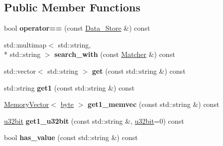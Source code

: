 \subsection*{Public Member Functions}
\begin{DoxyCompactItemize}
\item 
\hypertarget{classBotan_1_1Data__Store_a2b12f45cb3db15368eaa6463dc61c95f}{bool {\bfseries operator==} (const \hyperlink{classBotan_1_1Data__Store}{Data\-\_\-\-Store} \&) const }\label{classBotan_1_1Data__Store_a2b12f45cb3db15368eaa6463dc61c95f}

\item 
\hypertarget{classBotan_1_1Data__Store_a09a1fe6238a5af9b865b87dec741e165}{std\-::multimap$<$ std\-::string, \\*
std\-::string $>$ {\bfseries search\-\_\-with} (const \hyperlink{classBotan_1_1Data__Store_1_1Matcher}{Matcher} \&) const }\label{classBotan_1_1Data__Store_a09a1fe6238a5af9b865b87dec741e165}

\item 
\hypertarget{classBotan_1_1Data__Store_a5ae0472aff39fdf3799c735cf8a9aabc}{std\-::vector$<$ std\-::string $>$ {\bfseries get} (const std\-::string \&) const }\label{classBotan_1_1Data__Store_a5ae0472aff39fdf3799c735cf8a9aabc}

\item 
\hypertarget{classBotan_1_1Data__Store_af67e18961f5c353f710dced52b02a9da}{std\-::string {\bfseries get1} (const std\-::string \&) const }\label{classBotan_1_1Data__Store_af67e18961f5c353f710dced52b02a9da}

\item 
\hypertarget{classBotan_1_1Data__Store_a4db45f79562d4e91843bc72ca56f9c3b}{\hyperlink{classBotan_1_1MemoryVector}{Memory\-Vector}$<$ \hyperlink{namespaceBotan_a7d793989d801281df48c6b19616b8b84}{byte} $>$ {\bfseries get1\-\_\-memvec} (const std\-::string \&) const }\label{classBotan_1_1Data__Store_a4db45f79562d4e91843bc72ca56f9c3b}

\item 
\hypertarget{classBotan_1_1Data__Store_a42da6a79744fba0606b3d4305169a1f5}{\hyperlink{namespaceBotan_aacc7d03c95e97e76168fc1c819031830}{u32bit} {\bfseries get1\-\_\-u32bit} (const std\-::string \&, \hyperlink{namespaceBotan_aacc7d03c95e97e76168fc1c819031830}{u32bit}=0) const }\label{classBotan_1_1Data__Store_a42da6a79744fba0606b3d4305169a1f5}

\item 
\hypertarget{classBotan_1_1Data__Store_a8f7427ce8e293a0a046f89a78a622d20}{bool {\bfseries has\-\_\-value} (const std\-::string \&) const }\label{classBotan_1_1Data__Store_a8f7427ce8e293a0a046f89a78a622d20}


\end{DoxyCompactItemize}
